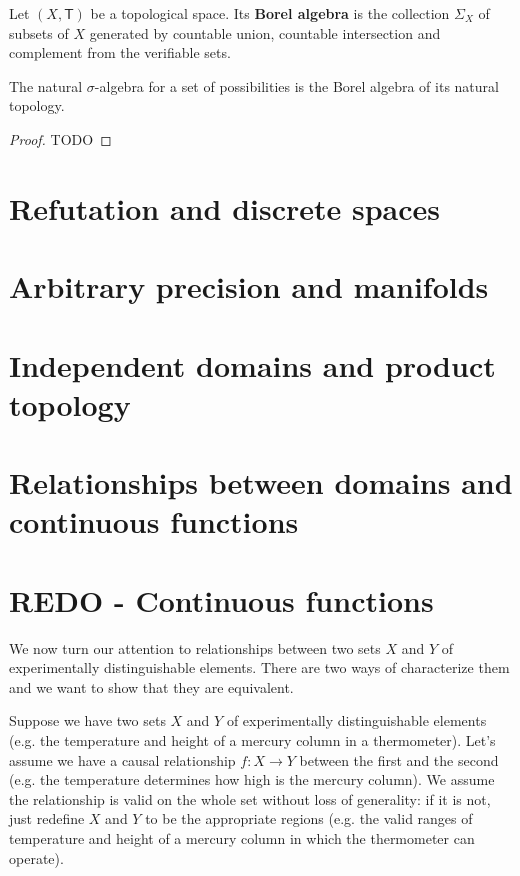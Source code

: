 \documentclass[11pt,letterpaper,fleqn]{memoir} %
\begin{document}
\begin{mathSection}
	
	\begin{defn}
		Let $(X, \mathsf{T})$ be a topological space. Its \textbf{Borel algebra} is the collection $\Sigma_X$ of subsets of $X$ generated by countable union, countable intersection and complement from the verifiable sets.
	\end{defn}
	
	\begin{prop}
		The natural $\sigma$-algebra for a set of possibilities is the Borel algebra of its natural topology.
	\end{prop}
	
	\begin{proof}
TODO
	\end{proof}
\end{mathSection}

\section{Refutation and discrete spaces}

\section{Arbitrary precision and manifolds}

\section{Independent domains and product topology}

\section{Relationships between domains and continuous functions}


\section{REDO - Continuous functions}

We now turn our attention to relationships between two sets $X$ and $Y$ of experimentally distinguishable elements. There are two ways of characterize them and we want to show that they are equivalent.

Suppose we have two sets $X$ and $Y$ of experimentally distinguishable elements (e.g. the temperature and height of a mercury column in a thermometer). Let's assume we have a causal relationship $f: X \rightarrow Y$ between the first and the second (e.g. the temperature determines how high is the mercury column). We assume the relationship is valid on the whole set without loss of generality: if it is not, just redefine $X$ and $Y$ to be the appropriate regions (e.g. the valid ranges of temperature and height of a mercury column in which the thermometer can operate).
\end{document}
